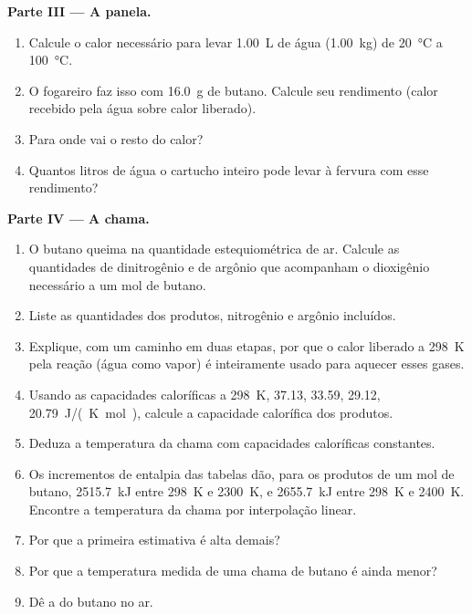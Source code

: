 \begin{problem}
\medskip
\noindent\textbf{Parte III --- A panela.}
\begin{enumerate}[resume]
  \item Calcule o calor necessário para levar \qty{1.00}{L} de água
        (\qty{1.00}{kg}) de \qty{20}{\celsius} a \qty{100}{\celsius}.
  \item O fogareiro faz isso com \qty{16.0}{g} de butano. Calcule seu
        rendimento (calor recebido pela água sobre calor liberado).
  \item Para onde vai o resto do calor?
  \item Quantos litros de água o cartucho inteiro pode levar à fervura
        com esse rendimento?
\end{enumerate}

\medskip
\noindent\textbf{Parte IV --- A chama.}
\begin{enumerate}[resume]
  \item O butano queima na quantidade estequiométrica de ar. Calcule as
        quantidades de dinitrogênio e de argônio que acompanham o
        dioxigênio necessário a um mol de butano.
  \item Liste as quantidades dos produtos, nitrogênio e argônio incluídos.
  \item Explique, com um caminho em duas etapas, por que o calor liberado a
        \qty{298}{K} pela reação (água como vapor) é inteiramente usado para
        aquecer esses gases.
  \item Usando as capacidades caloríficas a \qty{298}{K},  37.13,
         33.59,  29.12,  \qty{20.79}{J/(K.mol)},
        calcule a capacidade calorífica dos produtos.
  \item Deduza a temperatura da chama com capacidades caloríficas constantes.
  \item Os incrementos de entalpia das tabelas dão, para os produtos de um
        mol de butano, \qty{2515.7}{kJ} entre \qty{298}{K} e
        \qty{2300}{K}, e \qty{2655.7}{kJ} entre \qty{298}{K} e
        \qty{2400}{K}. Encontre a temperatura da chama por interpolação linear.
  \item Por que a primeira estimativa é alta demais?
  \item Por que a temperatura medida de uma chama de butano é ainda menor?
  \item Dê a  do butano no ar.
\end{enumerate}
\end{problem}
